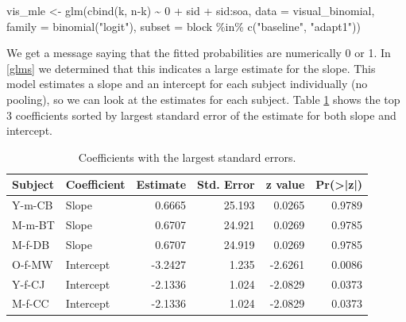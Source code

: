 \documentclass[11pt, oneside, openany]{scrbook}
\newenvironment{Shaded}{\begin{snugshade}}{\end{snugshade}}
\newcommand{\AttributeTok}[1]{\textcolor[rgb]{0.77,0.63,0.00}{#1}}
\newcommand{\DecValTok}[1]{\textcolor[rgb]{0.00,0.00,0.81}{#1}}
\newcommand{\FunctionTok}[1]{\textcolor[rgb]{0.00,0.00,0.00}{#1}}
\newcommand{\NormalTok}[1]{#1}
\newcommand{\OtherTok}[1]{\textcolor[rgb]{0.56,0.35,0.01}{#1}}
\newcommand{\SpecialCharTok}[1]{\textcolor[rgb]{0.00,0.00,0.00}{#1}}
\newcommand{\StringTok}[1]{\textcolor[rgb]{0.31,0.60,0.02}{#1}}
\begin{document}
\begin{Shaded}
\begin{Highlighting}[]
\NormalTok{vis\_mle }\OtherTok{\textless{}{-}} \FunctionTok{glm}\NormalTok{(}\FunctionTok{cbind}\NormalTok{(k, n}\SpecialCharTok{{-}}\NormalTok{k) }\SpecialCharTok{\textasciitilde{}} \DecValTok{0} \SpecialCharTok{+}\NormalTok{ sid }\SpecialCharTok{+}\NormalTok{ sid}\SpecialCharTok{:}\NormalTok{soa,}
               \AttributeTok{data =}\NormalTok{ visual\_binomial, }
               \AttributeTok{family =} \FunctionTok{binomial}\NormalTok{(}\StringTok{"logit"}\NormalTok{),}
               \AttributeTok{subset =}\NormalTok{ block }\SpecialCharTok{\%in\%} \FunctionTok{c}\NormalTok{(}\StringTok{"baseline"}\NormalTok{, }\StringTok{"adapt1"}\NormalTok{))}
\end{Highlighting}
\end{Shaded}


We get a message saying that the fitted probabilities are numerically 0 or 1. In \ref{glms} we determined that this indicates a large estimate for the slope. This model estimates a slope and an intercept for each subject individually (no pooling), so we can look at the estimates for each subject. Table \ref{tab:ch043-Intensive-Oyster} shows the top 3 coefficients sorted by largest standard error of the estimate for both slope and intercept.

\begin{table}[!h]

\caption{\label{tab:ch043-Intensive-Oyster}Coefficients with the largest standard errors.}
\centering
\begin{tabular}[t]{llrrrr}
\toprule
Subject & Coefficient & Estimate & Std. Error & z value & Pr(>|z|)\\
\midrule
Y-m-CB & Slope & 0.6665 & 25.193 & 0.0265 & 0.9789\\
M-m-BT & Slope & 0.6707 & 24.921 & 0.0269 & 0.9785\\
M-f-DB & Slope & 0.6707 & 24.919 & 0.0269 & 0.9785\\
O-f-MW & Intercept & -3.2427 & 1.235 & -2.6261 & 0.0086\\
Y-f-CJ & Intercept & -2.1336 & 1.024 & -2.0829 & 0.0373\\
\addlinespace
M-f-CC & Intercept & -2.1336 & 1.024 & -2.0829 & 0.0373\\
\bottomrule
\end{tabular}
\end{table}
\end{document}
